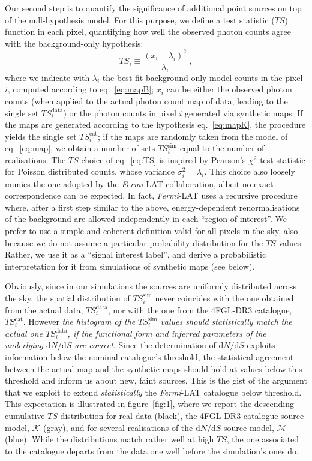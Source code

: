 \documentclass{article}
\def\dNdS{\textrm{d}N/\textrm{d}S}
\newcommand{\Fermi}{\textit{Fermi}}
\begin{document}
\medskip
%
Our second step is to quantify the significance of additional point sources on top of the
null-hypothesis model.
%
For this purpose, we define a test statistic ($TS$) function in each pixel, quantifying how well the  observed photon counts agree with the background-only hypothesis:    
\begin{equation}
    TS_i \equiv \frac{(x_i - \lambda_i)^2}{\lambda_i}~,
\label{eq:TS}
\end{equation}
where we indicate with $\lambda_i$ the best-fit background-only model counts in the pixel $i$, computed according to eq.~\eqref{eq:mapB};  $x_i$ can be either the observed photon counts 
(when applied to the actual photon count map of data, leading to the single set $TS^\textrm{data}_i$) or the  photon counts in pixel $i$ generated via synthetic maps. If the maps are generated according to  the hypothesis eq.~\eqref{eq:mapK}, the procedure yields the single set $TS^\textrm{cat}_i$; if the maps are randomly taken from the model of eq.~\eqref{eq:map}, we obtain a number of sets $TS^\textrm{sim}_i$ equal to the number of realisations.
The $TS$ choice of eq.~\eqref{eq:TS} is inspired by Pearson's $\chi^2$ test statistic for Poisson distributed counts,
whose variance $\sigma_i^2=\lambda_i$. 
This choice also loosely mimics the one adopted by the \Fermi-LAT collaboration, albeit no exact correspondence can be expected.  In fact, \Fermi-LAT uses a recursive procedure where, after a first step similar to the above, energy-dependent renormalisations of the background are allowed independently in each ``region of interest''.  We prefer to use a simple and coherent definition valid for all pixels in the sky, also because we do not assume a particular probability distribution for the $TS$ values. Rather, we use it as a ``signal interest label'', and derive a probabilistic interpretation for it from simulations of synthetic maps (see below). 

Obviously, since in our simulations the sources are uniformly distributed across the sky, the spatial distribution of $TS^\textrm{sim}_i$  never coincides with the one obtained from the actual data, $TS^\textrm{data}_i$, nor with the one from the 4FGL-DR3 catalogue, $TS^\textrm{cat}_i$. However \textit{the histogram of the $TS^\textrm{sim}_i$ values should statistically match the actual one $TS^\textrm{data}_i$, if the functional form and inferred parameters of the underlying $\dNdS$ are correct}.  
Since the determination of $\dNdS$ exploits information below the nominal catalogue's threshold, the statistical agreement between the actual map and the synthetic maps should hold at values below this threshold and inform us about new, faint sources. This is the gist of the argument that we exploit to extend \textit{statistically} the \Fermi-LAT catalogue below threshold. This expectation is illustrated in figure~\ref{fig:1}, where we report the descending cumulative $TS$ distribution for real data (black), the 4FGL-DR3 catalogue source model, $\mathcal{K}$ (gray), and for several realisations of the $\dNdS$ source model, $\mathcal{M}$ (blue). While the distributions match rather well at high $TS$, the one associated to the catalogue departs from the data one well before the simulation's ones do. 
\end{document}
